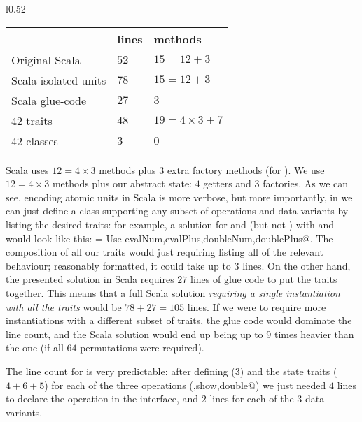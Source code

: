 \begin{wraptable}{l}{0.52\textwidth}
\begin{tabular}{@{}l l l @{}}
\toprule
&                              lines  &   methods\\
\midrule
Original Scala          & $52$     &  $15=12+3$\\
Scala  isolated units   & $78$    &  $15=12+3$\\
Scala  glue-code        & $27$   &     $3$\\
42 traits               & $48$
 &    $19=4\times3+7$\\
42 classes              &   $3$    &     $0$\\
\bottomrule
\end{tabular}
\end{wraptable}
Scala uses $12=4\times3$ methods plus $3$ extra factory methods (for \Q@double@).
We use $12=4\times3$ methods plus our abstract state: 
$4$ getters and $3$ factories.
As we can see, encoding atomic units in Scala is
more verbose,
but more importantly,
in \name we can just define a class supporting any subset of operations
and data-variants by listing the desired traits:
for example, a solution for \Q@Num@ and \Q@Plus@ (but not \Q@Neg@)
with \Q@eval@ and \Q@double@ would look like this:
%
\Q@Example= Use evalNum,evalPlus,doubleNum,doublePlus@.
The composition of all our traits would just requiring listing all
of the relevant behaviour;
reasonably formatted, it could take up to $3$ lines.
On the other hand, the presented solution in Scala requires
$27$ lines of glue code to put the traits together.
This means that a full Scala solution \emph{requiring a single instantiation with all the traits} would be $78+27=105$ lines.
If we were to require more instantiations with a different subset of traits, the glue code would dominate the line count,
and the Scala solution would end up being up to $9$ times heavier than the
\name one (if all $64$ permutations were required).

The line count for \name is very predictable: after defining \Q@exp@ ($3$) and the state traits ($4+6+5$)
for each of the three operations (\Q@eval,show,double@) 
we just needed $4$ lines to declare the operation 
in the interface, and $2$ lines for each of the $3$ data-variants.

